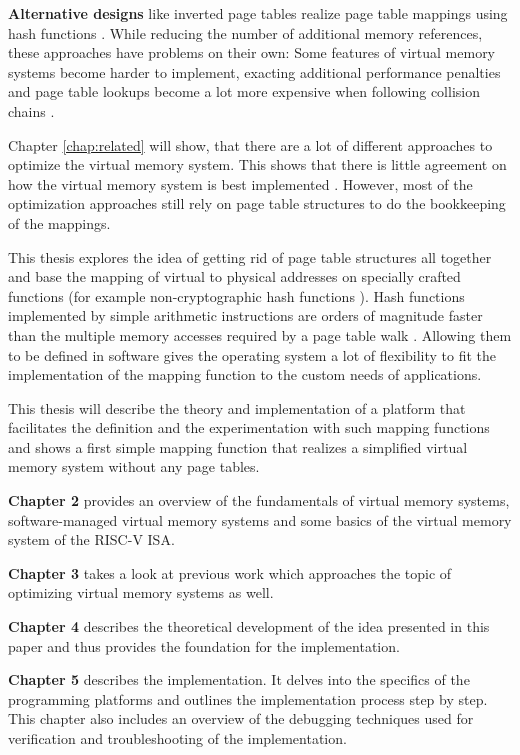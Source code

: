 \textbf{Alternative designs} like inverted page tables realize page table mappings using hash functions \cite{tanenbaumOS}. While reducing the number of additional memory references, these approaches have problems on their own: Some features of virtual memory systems become harder to implement, exacting additional performance penalties \cite{yaniv2016hash} and page table lookups become a lot more expensive when following collision chains \cite{jacob1998look}.

Chapter \ref{chap:related} will show, that there are a lot of different approaches to optimize the virtual memory system.
This shows that there is little agreement on how the virtual memory system is best implemented \cite{jacob1998look}.
However, most of the optimization approaches still rely on page table structures to do the bookkeeping of the mappings.

This thesis explores the idea of getting rid of page table structures all together and base the mapping of virtual to physical addresses on specially crafted functions (for example non-cryptographic hash functions \cite{mittelbach2021non}).
Hash functions implemented by simple arithmetic instructions are orders of magnitude faster than the multiple memory accesses required by a page table walk \cite{tanenbaumOS}. Allowing them to be defined in software gives the operating system a lot of flexibility to fit the implementation of the mapping function to the custom needs of applications.

This thesis will describe the theory and implementation of a platform that facilitates the definition and the experimentation with such mapping functions and shows a first simple mapping function that realizes a simplified virtual memory system without any page tables.


\textbf{Chapter 2} provides an overview of the fundamentals of virtual memory systems, software-managed virtual memory systems and some basics of the virtual memory system of the RISC-V ISA.

\textbf{Chapter 3} takes a look at previous work which approaches the topic of optimizing virtual memory systems as well.

\textbf{Chapter 4} describes the theoretical development of the idea presented in this paper and thus provides the foundation for the implementation.

\textbf{Chapter 5} describes the implementation. It delves into the specifics of the programming platforms and outlines the implementation process step by step. This chapter also includes an overview of the debugging techniques used for verification and troubleshooting of the implementation.

